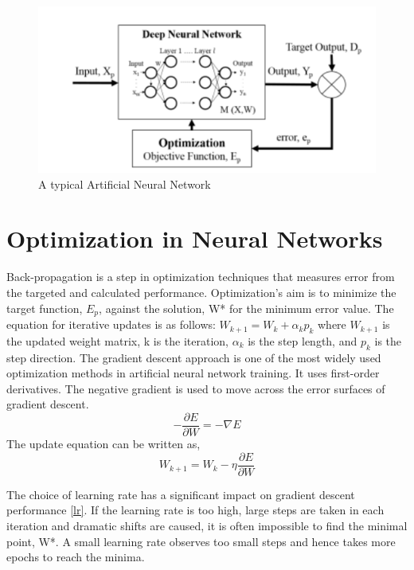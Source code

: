 \documentclass[journal]{IEEEtran}
\begin{document}
\begin{figure}%
\centering
\includegraphics[width=.9\linewidth]{Figures/dl}
\caption{A typical Artificial Neural Network}
\label{table:Comparison}
\end{figure}


\section{Optimization in Neural Networks}
Back-propagation is a step in optimization techniques that measures error from the targeted and calculated performance. Optimization's aim is to minimize the target function, $E_{p}$, against the solution, W* for the minimum error value. The equation for iterative updates is as follows:
$ W_{k+1}=W_{k}+\alpha_{k} p_{k} $
where $W_{k+1}$ is the updated weight matrix, k is the iteration, $\alpha_{k}$ is the step length, and $p_{k}$ is the step direction. The gradient descent approach is one of the most widely used optimization methods in artificial neural network training. It uses first-order derivatives. The negative gradient is used to move across the error surfaces of gradient descent.
$$ -\frac{\partial E}{\partial W}=-\nabla E $$
The update equation can be written as, 
$$ W_{k+1}=W_{k}-\eta \frac{\partial E}{\partial W} $$

The choice of learning rate has a significant impact on gradient descent performance \ref{lr}. If the learning rate is too high, large steps are taken in each iteration and dramatic shifts are caused, it is often impossible to find the minimal point, W*.  A small learning rate observes too small steps and hence takes more epochs to reach the minima.
\end{document}
